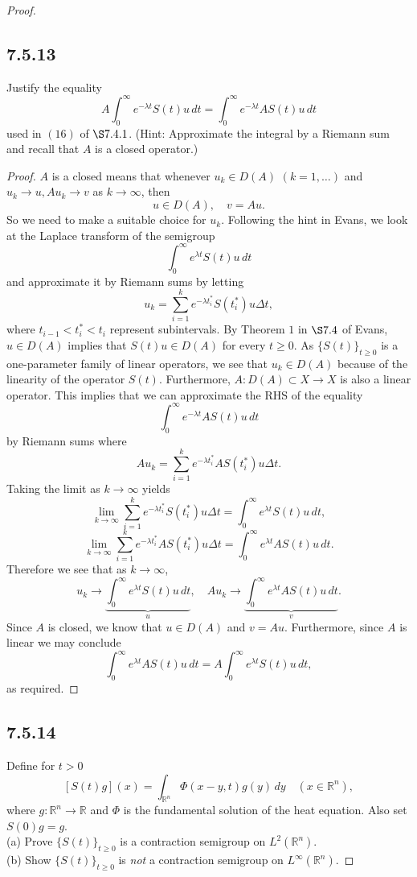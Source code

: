 \documentclass{article}
\begin{document}
\begin{flushleft}
\begin{proof}
\subsection{\textbf{7.5.13}} Justify the equality
$$A\int_0^{\infty}e^{-\lambda t}S(t)u\,dt = \int_0^{\infty} e^{-\lambda t}AS(t)u\,dt$$
used in $(16)$ of $\S7.4.1$. (Hint: Approximate the integral by a Riemann sum and recall that $A$ is a closed operator.)
\begin{proof}
$A$ is a closed means that whenever $u_k\in D(A)$ $(k=1,\ldots)$ and $u_k\to u, Au_k \to v$ as $k\to\infty$, then 
$$u\in D(A),\quad v=Au.$$
So we need to make a suitable choice for $u_k$. Following the hint in Evans, we look at the Laplace transform of the semigroup
$$\int_0^{\infty}e^{\lambda t}S(t)u\,dt$$
and approximate it by Riemann sums by letting
$$u_k = \sum_{i=1}^k e^{-\lambda t_i^*} S(t_i^*) u \Delta t,$$
where $t_{i-1}<t_i^* < t_i$ represent subintervals. By Theorem $1$ in $\S 7.4$ of Evans, $u\in D(A)$ implies that $S(t)u\in D(A)$ for every $t\ge 0$. As $\{S(t)\}_{t\ge 0}$ is a one-parameter family of linear operators, we see that $u_k \in D(A)$ because of the linearity of the operator $S(t)$. Furthermore, $A:D(A)\subset X \to X$ is also a linear operator. This implies that we can approximate the RHS of the equality
$$\int_0^{\infty} e^{-\lambda t}AS(t)u\,dt$$
by Riemann sums where
$$Au_k=\sum_{i=1}^k e^{-\lambda t_i^*} AS(t_i^*) u \Delta t.$$
Taking the limit as $k\to\infty$ yields
$$\lim_{k\to\infty}\sum_{i=1}^k e^{-\lambda t_i^*} S(t_i^*) u \Delta t = \int_0^{\infty}e^{\lambda t}S(t)u\,dt,$$
$$\lim_{k\to\infty}\sum_{i=1}^k e^{-\lambda t_i^*} AS(t_i^*) u \Delta t = \int_0^{\infty}e^{\lambda t}AS(t)u\,dt.$$
Therefore we see that as $k\to\infty$,
$$u_k \to \underbrace{\int_0^{\infty}e^{\lambda t}S(t)u\,dt}_{u}, \quad Au_k \to \underbrace{\int_0^{\infty}e^{\lambda t}AS(t)u\,dt}_{v}.$$
Since $A$ is closed, we know that $u\in D(A)$ and $v=Au$. Furthermore, since $A$ is linear we may conclude
$$\int_0^{\infty}e^{\lambda t}AS(t)u\,dt = A\int_0^{\infty}e^{\lambda t}S(t)u\,dt,$$
as required.
\end{proof}
\subsection{\textbf{7.5.14}} Define for $t>0$
$$[S(t)g](x) = \int_{\mathbb R^n} \Phi(x-y,t)g(y)\,dy\quad (x\in\mathbb R^n),$$
where $g:\mathbb R^n \to \mathbb R$ and $\Phi$ is the fundamental solution of the heat equation. Also set $S(0)g=g$.
\\
\vspace{2px}
(a) Prove $\{S(t)\}_{t\ge 0}$ is a contraction semigroup on $L^2(\mathbb R^n).$
\\
\vspace{2px}
(b) Show $\{S(t)\}_{t\ge 0}$ is \textit{not} a contraction semigroup on $L^{\infty}(\mathbb R^n).$


\end{proof}
\end{flushleft}
\end{document}
